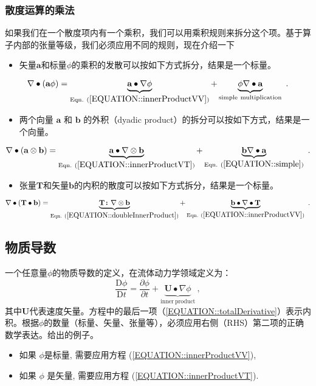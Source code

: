 \documentclass[LBMDerivation.tex]{subfiles}
\begin{document}
\subsubsection{散度运算的乘法}
%
%
	如果我们在一个散度项内有一个乘积，我们可以用乘积规则来拆分这个项。基于算子内部的$\texttt{张量}$等级，我们必须应用不同的规则，现在介绍一下
%
%
\begin{itemize}
    \item 矢量$\textbf{a}$和标量$\phi$的乘积的发散可以按如下方式拆分，结果是一个标量。
\end{itemize}
%
%
\begin{equation}
 \nabla \bullet (\textbf{a} \phi)  =  \underbrace{\textbf{a} \bullet \nabla \phi}_{\mathrm{Eqn.~} (\ref{EQUATION::innerProductVV})} + \underbrace{\phi \nabla \bullet \textbf{a}}_{\mathrm{simple~multiplication}}~.
 \label{EQUATION::productRuleVS}
\end{equation}
%
%
\begin{itemize}
    \item 两个向量 $\textbf{a}$ 和 $\textbf{b}$ 的外积（dyadic product）的拆分可以按如下方式，结果是一个向量。
\end{itemize}
%
%
\begin{equation}
 \nabla \bullet (\textbf{a} \otimes \textbf{b})  =  \underbrace{\textbf{a} \bullet \nabla \otimes \textbf{b}}_{\mathrm{Eqn.~}(\ref{EQUATION::innerProductVT})} + \underbrace{\textbf{b} \nabla \bullet \textbf{a}}_{\mathrm{Eqn.~}(\ref{EQUATION::simple})} ~.
 \label{EQUATION::productRuleVV}
\end{equation}
%
%
\begin{itemize}
    \item 张量$\textbf{T}$和矢量$\textbf{b}$的内积的散度可以按如下方式拆分，结果是一个标量。
\end{itemize}
%
%
\begin{equation}
 \nabla \bullet (\textbf{T} \bullet \textbf{b})  =  \underbrace{\textbf{T} \boldsymbol \colon \nabla \otimes \textbf{b}}_{\mathrm{Eqn.~} (\ref{EQUATION::doubleInnerProduct})} + \underbrace{\textbf{b} \bullet \nabla \bullet \textbf{T}}_{\mathrm{Eqn.~}(\ref{EQUATION::innerProductVV})} ~.
 \label{EQUATION::productRuleTV}
\end{equation}
%
%
%
%
\subsection{物质导数}
%
%
      一个任意量$\phi$的物质导数的定义，在流体动力学领域定义为：
%
%
\begin{equation}
    \frac{\mathrm{D}\phi}{\mathrm{D}t} = \frac{\partial \phi}{\partial t} + \underbrace{\textbf{U}\bullet \nabla \phi}_{\mathrm{inner~product}} ~,
    \label{EQUATION::totalDerivative}
\end{equation}
%
%
	其中$\textbf{U}$代表速度矢量。方程中的最后一项（\ref{EQUATION::totalDerivative}）表示内积。根据$\phi$的数量（标量、矢量、张量等），必须应用右侧（RHS）第二项的正确数学表达。给出的例子。
%
%
\begin{itemize}
    \item 如果 $\phi$是标量, 需要应用方程 (\ref{EQUATION::innerProductVV}),
    \item 如果 $\phi$ 是矢量, 需要应用方程 (\ref{EQUATION::innerProductVT}).
\end{itemize}
%
%
%
%
\end{document}
